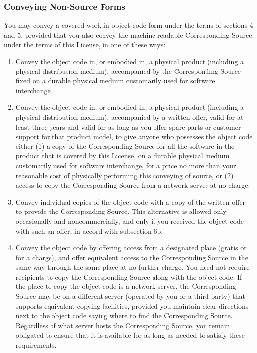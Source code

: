 \documentclass{ctexart}
\begin{document}
\subsubsection{Conveying Non-Source Forms}

  You may convey a covered work in object code form under the terms
of sections 4 and 5, provided that you also convey the
machine-readable Corresponding Source under the terms of this License,
in one of these ways:
\begin{enumerate}
\renewcommand\theenumiP{\roman{enumi}}
    
  \item Convey the object code in, or embodied in, a physical product
    (including a physical distribution medium), accompanied by the
    Corresponding Source fixed on a durable physical medium
    customarily used for software interchange.

    
  \item  Convey the object code in, or embodied in, a physical product
    (including a physical distribution medium), accompanied by a
    written offer, valid for at least three years and valid for as
    long as you offer spare parts or customer support for that product
    model, to give anyone who possesses the object code either (1) a
    copy of the Corresponding Source for all the software in the
    product that is covered by this License, on a durable physical
    medium customarily used for software interchange, for a price no
    more than your reasonable cost of physically performing this
    conveying of source, or (2) access to copy the
    Corresponding Source from a network server at no charge.

   
  \item  Convey individual copies of the object code with a copy of the
    written offer to provide the Corresponding Source.  This
    alternative is allowed only occasionally and noncommercially, and
    only if you received the object code with such an offer, in accord
    with subsection 6b.

   
  \item  Convey the object code by offering access from a designated
    place (gratis or for a charge), and offer equivalent access to the
    Corresponding Source in the same way through the same place at no
    further charge.  You need not require recipients to copy the
    Corresponding Source along with the object code.  If the place to
    copy the object code is a network server, the Corresponding Source
    may be on a different server (operated by you or a third party)
    that supports equivalent copying facilities, provided you maintain
    clear directions next to the object code saying where to find the
    Corresponding Source.  Regardless of what server hosts the
    Corresponding Source, you remain obligated to ensure that it is
    available for as long as needed to satisfy these requirements.


\end{enumerate}
\end{document}
